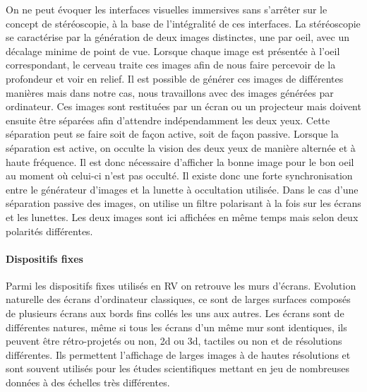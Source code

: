 On ne peut évoquer les interfaces visuelles immersives sans s'arrêter sur le concept de stéréoscopie, à la base de l'intégralité de ces interfaces. La stéréoscopie se caractérise par la génération de deux images distinctes, une par oeil, avec un décalage minime de point de vue. Lorsque chaque image est présentée à l'oeil correspondant, le cerveau traite ces images afin de nous faire percevoir de la profondeur et voir en relief. Il est possible de générer ces images de différentes manières mais dans notre cas, nous travaillons avec des images générées par ordinateur. Ces images sont restituées par un écran ou un projecteur mais doivent ensuite être séparées afin d'attendre indépendamment les deux yeux. Cette séparation peut se faire soit de façon active, soit de façon passive. Lorsque la séparation est active, on occulte la vision des deux yeux de manière alternée et à haute fréquence. Il est donc nécessaire d'afficher la bonne image pour le bon oeil au moment où celui-ci n'est pas occulté. Il existe donc une forte synchronisation entre le générateur d'images et la lunette à occultation utilisée.
Dans le cas d'une séparation passive des images, on utilise un filtre polarisant à la fois sur les écrans et les lunettes. Les deux images sont ici affichées en même temps mais selon deux polarités différentes.

\paragraph{Dispositifs fixes} \label{dispo_fix}

Parmi les dispositifs fixes utilisés en RV on retrouve les murs d'écrans. Evolution naturelle des écrans d'ordinateur classiques, ce sont de larges surfaces composés de plusieurs écrans aux bords fins collés les uns aux autres. Les écrans sont de différentes natures, même si tous les écrans d'un même mur sont identiques, ils peuvent être rétro-projetés ou non, 2d ou 3d, tactiles ou non et de résolutions différentes. Ils permettent l'affichage de larges images à de hautes résolutions et sont souvent utilisés pour les études scientifiques mettant en jeu de nombreuses données à des échelles très différentes.

